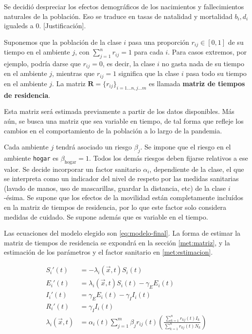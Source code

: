 

Se decidió despreciar los efectos demográficos de los nacimientos y fallecimientos naturales de la población. Eso se traduce en tasas de natalidad y mortalidad \(b_i, d_i\) igualeds a 0. [Justificación]. 

Suponemos que la población de la clase \(i\) pasa una proporción \(r_{ij} \in [0,1]\) de su tiempo en el ambiente \(j\), con \(\sum_{j = 1}^{n} r_{ij} = 1\) para cada \(i\). Para casos extremos, por ejemplo, podría darse que \(r_{ij} = 0\), es decir, la clase \(i\) no gasta nada de su tiempo en el ambiente \(j\), mientras que \(r_{ij} = 1\) significa que la clase \(i\) pasa todo su tiempo en el ambiente \(j\). La matriz \(\mathbf{R} = \{r_{ij}\}_{i = 1\dots n,j \dots m}\) es llamada \textbf{matriz de tiempos de residencia}.

Esta matriz será estimada previamente a partir de los datos disponibles. Más aún, se busca una matriz que sea variable en tiempo, de tal forma que refleje los cambios en el comportamiento de la población a lo largo de la pandemia.

Cada ambiente \(j\) tendrá asociado un riesgo \(\beta_j\). Se impone que el riesgo en el ambiente \texttt{hogar} es \(\beta_{\text{hogar}} = 1\). Todos los demás riesgos deben fijarse relativos a ese valor. Se decide incorporar un factor sanitario \(\alpha_i\), dependiente de la clase, el que se interpreta como un indicador del nivel de respeto por las medidas sanitarias (lavado de manos, uso de mascarillas, guardar la distancia, etc) de la clase \(i\)-ésima. Se supone que los efectos de la movilidad están completamente incluídos en la matriz de tiempos de residencia, por lo que este factor solo considera medidas de cuidado. Se supone además que es variable en el tiempo. 

Las ecuaciones del modelo elegido son \ref{eq:modelo-final}. La forma de estimar la matriz de tiempos de residencia se expondrá en la sección \ref{met:matriz}, y la estimación de los parámetros y el factor sanitario en \ref{met:estimacion}.

\begin{equation}\label{eq:modelo-final}
\begin{aligned}
S_i'(t) &= - \lambda_i(\vec{x}, t) S_i(t) \\
E_i'(t) &= \lambda_i(\vec{x}, t) S_i(t)  - \gamma_E E_i(t) \\ 
I_i'(t) &= \gamma_E E_i(t)  - \gamma_I I_i(t) \\ 
R_i'(t) &= \gamma_I I_i(t) \\
\lambda_i(\vec{x}, t) &= \alpha_i(t)\sum_{j=1}^m \beta_{j}r_{ij}(t)\left(\frac{\sum_{k=1}^{n}r_{kj}(t) I_k}{\sum_{k=1}^{n}r_{kj}(t)N_k}\right)
\end{aligned}
\end{equation}

